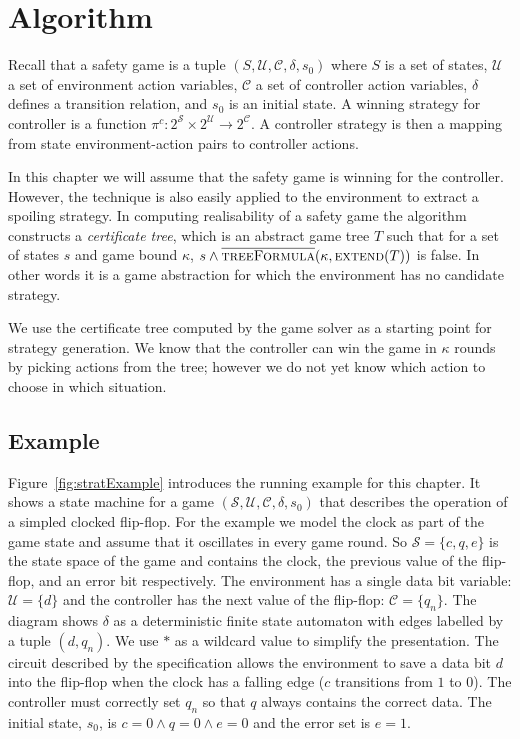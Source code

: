 \section{Algorithm}

Recall that a safety game is a tuple $(S, \mathcal{U}, \mathcal{C}, \delta, s_0)$ where $S$ is a set of states, $\mathcal{U}$ a set of environment action variables, $\mathcal{C}$ a set of controller action variables, $\delta$ defines a transition relation, and $s_0$ is an initial state. A winning strategy for controller is a function $\pi^c : 2^{\mathcal{S}} \times 2^{\mathcal{U}} \to 2^{\mathcal{C}}$. A controller strategy is then a mapping from state environment-action pairs to controller actions.

In this chapter we will assume that the safety game is winning for the controller. However, the technique is also easily applied to the environment to extract a spoiling strategy. In computing realisability of a safety game the algorithm constructs a \emph{certificate tree}, which is an abstract game tree $T$ such that for a set of states $s$ and game bound $\kappa$, $s \land \textsc{$\overline{\mbox{treeFormula}}$}(\kappa, \textsc{extend}(T))$ is false. In other words it is a game abstraction for which the environment has no candidate strategy.

We use the certificate tree computed by the game solver as a starting point for strategy generation.  We know that the controller can win the game in $\kappa$ rounds by picking actions from the tree; however we do not yet know which action to choose in which situation.


\subsection{Example}

Figure~\ref{fig:stratExample} introduces the running example for this chapter. It shows a state machine for a game $(\mathcal{S}, \mathcal{U}, \mathcal{C}, \delta, s_0)$ that describes the operation of a simpled clocked flip-flop. For the example we model the clock as part of the game state and assume that it oscillates in every game round. So $\mathcal{S} = \{ c, q, e \}$ is the state space of the game and contains the clock, the previous value of the flip-flop, and an error bit respectively. The environment has a single data bit variable: $\mathcal{U} = \{ d \}$ and the controller has the next value of the flip-flop: $\mathcal{C} = \{ q_n \}$. The diagram shows $\delta$ as a deterministic finite state automaton with edges labelled by a tuple $(d, q_n)$. We use $*$ as a wildcard value to simplify the presentation. The circuit described by the specification allows the environment to save a data bit $d$ into the flip-flop when the clock has a falling edge ($c$ transitions from $1$ to $0$). The controller must correctly set $q_n$ so that $q$ always contains the correct data. The initial state, $s_0$, is $c = 0 \land q = 0 \land e = 0$ and the error set is $e = 1$.

